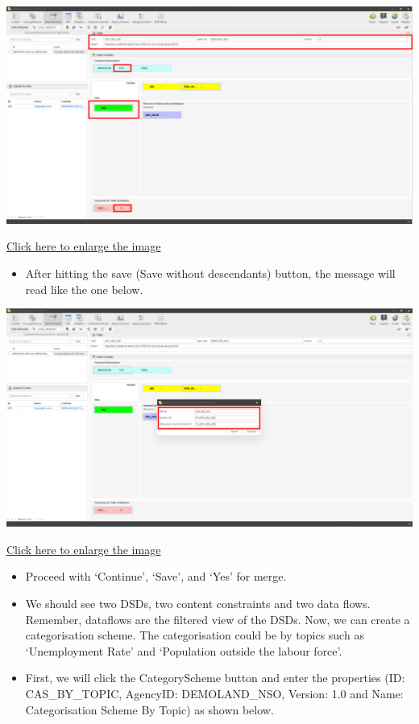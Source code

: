 \documentclass[
]{book}
\providecommand{\tightlist}{%
  \setlength{\itemsep}{0pt}\setlength{\parskip}{0pt}}
\begin{document}
\begin{center}\includegraphics[width=1\linewidth]{./images/image156} \end{center}

\href{images/image156.png}{Click here to enlarge the image}

\begin{itemize}
\tightlist
\item
  After hitting the save (Save without descendants) button, the message will read like the one below.
\end{itemize}

\begin{center}\includegraphics[width=1\linewidth]{./images/image158} \end{center}

\href{images/image158.png}{Click here to enlarge the image}

\begin{itemize}
\tightlist
\item
  Proceed with `Continue', `Save', and `Yes' for merge.
\item
  We should see two DSDs, two content constraints and two data flows. Remember, dataflows are the filtered view of the DSDs.
  Now, we can create a categorisation scheme. The categorisation could be by topics such as `Unemployment Rate' and `Population outside the labour force'.
\item
  First, we will click the CategoryScheme button and enter the properties (ID: CAS\_BY\_TOPIC, AgencyID: DEMOLAND\_NSO, Version: 1.0 and Name: Categorisation Scheme By Topic) as shown below.
\end{itemize}
\end{document}
